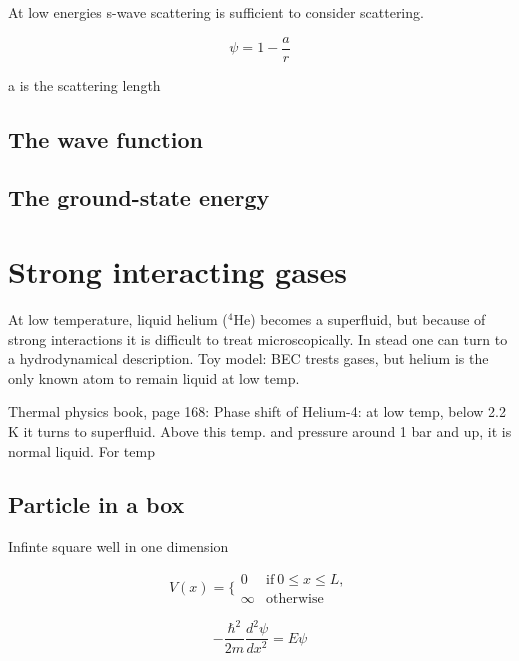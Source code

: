 At low energies s-wave scattering is sufficient to consider scattering. 

\begin{equation}
\psi = 1 - \frac{a}{r}
\end{equation}

a is the scattering length

\subsection{The wave function}





\subsection{The ground-state energy}

\section{Strong interacting gases}

At low temperature, liquid helium ($^4$He) becomes a superfluid, but because of strong interactions it is difficult to treat microscopically. In stead one can turn to a hydrodynamical description. Toy model: BEC trests gases, but helium is the only known atom to remain liquid at low temp. 

Thermal physics book, page 168:
Phase shift of Helium-4: at low temp, below 2.2 K it turns to superfluid.
Above this temp. and pressure around 1 bar and up, it is normal liquid. For temp 


\subsection{Particle in a box}

Infinte square well in one dimension

\begin{equation} \label{eq:potential_infinit_sq_well}
 V(x) =  \Bigg\{
 \begin{array}{ll}
	 0 & \text{if}\ 0 \leq x \leq L,\\
	 \infty & \text{otherwise}
 \end{array}
\end{equation}

\begin{equation}
- \frac{\hbar^2}{2m} \frac{d^2 \psi}{dx^2} = E \psi
\end{equation}

